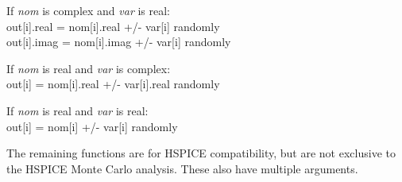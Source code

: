 \begin{description}
\begin{description}
\item{If {\it nom} is complex and {\it var} is real:}\\
  {\vt out[i].real = nom[i].real +/- var[i]} randomly\\
  {\vt out[i].imag = nom[i].imag +/- var[i]} randomly

\item{If {\it nom} is real and {\it var} is complex:}\\
  {\vt out[i] = nom[i].real +/- var[i].real} randomly

\item{If {\it nom} is real and {\it var} is real:}\\
  {\vt out[i] = nom[i] +/- var[i]} randomly
\end{description}
\end{description}

The remaining functions are for HSPICE compatibility, but are not
exclusive to the HSPICE Monte Carlo analysis.  These also have
multiple arguments.

